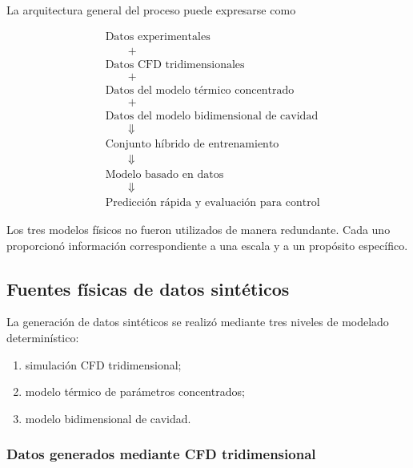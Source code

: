 La arquitectura general del proceso puede expresarse como

\begin{equation}
\boxed{
\begin{aligned}
&\text{Datos experimentales}
\\
&\qquad+
\\
&\text{Datos CFD tridimensionales}
\\
&\qquad+
\\
&\text{Datos del modelo térmico concentrado}
\\
&\qquad+
\\
&\text{Datos del modelo bidimensional de cavidad}
\\
&\qquad\Downarrow
\\
&\text{Conjunto híbrido de entrenamiento}
\\
&\qquad\Downarrow
\\
&\text{Modelo basado en datos}
\\
&\qquad\Downarrow
\\
&\text{Predicción rápida y evaluación para control}
\end{aligned}
}
\label{eq:hybrid_framework_general}
\end{equation}

Los tres modelos físicos no fueron utilizados de manera redundante. Cada uno proporcionó información correspondiente a una escala y a un propósito específico.

\subsection{Fuentes físicas de datos sintéticos}
\label{subsec:fuentes_datos_sinteticos}

La generación de datos sintéticos se realizó mediante tres niveles de modelado determinístico:

\begin{enumerate}
    \item simulación CFD tridimensional;
    \item modelo térmico de parámetros concentrados;
    \item modelo bidimensional de cavidad.
\end{enumerate}

\subsubsection{Datos generados mediante CFD tridimensional}

